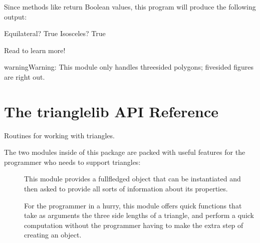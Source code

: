 \documentclass[letterpaper,10pt,english]{sphinxmanual}
\begin{document}
\begin{sphinxVerbatim}[commandchars=\\\{\}]
   
    
 
 
\end{sphinxVerbatim}

Since methods like {\hyperref[\detokenize{api:trianglelib.shape.Triangle.is_equilateral}]{}}
return Boolean values, this program will produce the following output:

\begin{sphinxVerbatim}[commandchars=\\\{\}]
Equilateral? True
Isosceles? True
\end{sphinxVerbatim}

Read {\hyperref[\detokenize{guide::doc}]{}} to learn more!

\begin{sphinxadmonition}{warning}{Warning:}
This module only handles three\sphinxhyphen{}sided polygons;
five\sphinxhyphen{}sided figures are right out.
\end{sphinxadmonition}


\chapter{The trianglelib API Reference}
\label{\detokenize{api:module-trianglelib}}\label{\detokenize{api:the-trianglelib-api-reference}}\label{\detokenize{api::doc}}
Routines for working with triangles.

The two modules inside of this package are packed with useful features
for the programmer who needs to support triangles:
\begin{description}
\item[{}] \leavevmode
This module provides a full\sphinxhyphen{}fledged  object that can be
instantiated and then asked to provide all sorts of information
about its properties.

\item[{}] \leavevmode
For the programmer in a hurry, this module offers quick functions
that take as arguments the three side lengths of a triangle, and
perform a quick computation without the programmer having to make
the extra step of creating an object.

\end{description}
\end{document}
